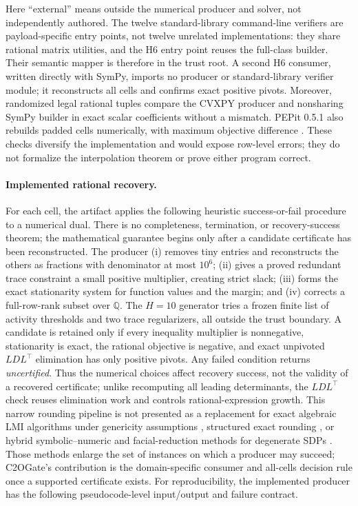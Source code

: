 \documentclass[smallextended]{svjour3}
\begin{document}
Here ``external'' means outside the numerical producer and solver, not
independently authored.  The twelve standard-library command-line
verifiers are payload-specific entry points, not twelve unrelated
implementations: they share rational matrix utilities, and the H6 entry point
reuses the full-class builder.  Their semantic mapper is therefore in the
trust root.  A second H6 consumer, written directly with SymPy, imports no
producer or standard-library verifier module; it reconstructs all
\HsixIndependentSympyCells{} cells and confirms
\HsixIndependentSympyPivots{} exact positive pivots.  Moreover,
\ConsumerFuzzCases{} randomized legal rational tuples compare the CVXPY
producer and nonsharing SymPy builder in \ConsumerFuzzComparisons{} exact
scalar coefficients without a mismatch.  PEPit 0.5.1 also rebuilds
\PaddedCrosscheckCells{} padded cells numerically, with maximum objective
difference \PaddedCrosscheckMaxDifference{}.  These checks diversify the
implementation and would expose row-level errors; they do not formalize the
interpolation theorem or prove either program correct.

\paragraph{Implemented rational recovery.}
For each cell, the artifact applies the following heuristic success-or-fail
procedure to a numerical dual.  There is no completeness, termination, or
recovery-success theorem; the mathematical guarantee begins only after a
candidate certificate has been reconstructed.  The producer (i) removes tiny
entries and reconstructs the others as
fractions with denominator at most $10^6$; (ii) gives a proved redundant trace
constraint a small positive multiplier, creating strict slack; (iii) forms the
exact stationarity system for function values and the margin; and (iv) corrects
a full-row-rank subset over $\mathbb Q$.  The $H=10$ generator tries a frozen
finite list of activity thresholds and two trace regularizers, all outside the
trust boundary.  A candidate is retained only if every inequality multiplier
is nonnegative, stationarity is exact, the rational objective is negative,
and exact unpivoted $LDL^\top$ elimination has only positive pivots.  Any
failed condition returns \emph{uncertified}.  Thus the numerical choices affect
recovery success, not the validity of a recovered certificate; unlike
recomputing all leading determinants, the $LDL^\top$ check reuses elimination
work and controls rational-expression growth.  This narrow rounding pipeline
is not presented as a replacement for exact algebraic LMI algorithms under
genericity assumptions \citep{HenrionNaldiSafeyElDin2016}, structured exact
rounding \citep{DostertDeLaatMoustrou2021}, or hybrid symbolic--numeric and
facial-reduction methods for degenerate SDPs
\citep{KolmogorovNaldiZapata2025}.  Those methods enlarge the set of instances
on which a producer may succeed; C2OGate's contribution is the domain-specific
consumer and all-cells decision rule once a supported certificate exists.
For reproducibility, the implemented producer has the following
pseudocode-level input/output and failure contract.
\end{document}
